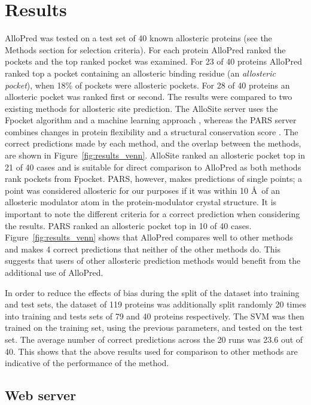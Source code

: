 \section{Results}

AlloPred was tested on a test set of 40 known allosteric proteins (see the Methods section for selection criteria).
For each protein AlloPred ranked the pockets and the top ranked pocket was examined.
For 23 of 40 proteins AlloPred ranked top a pocket containing an allosteric binding residue (an \emph{allosteric pocket}), when 18\% of pockets were allosteric pockets.
For 28 of 40 proteins an allosteric pocket was ranked first or second.
The results were compared to two existing methods for allosteric site prediction.
The AlloSite server uses the Fpocket algorithm and a machine learning approach \cite{Huang2013}, whereas the PARS server combines changes in protein flexibility and a structural conservation score \cite{Panjkovich2014}.
The correct predictions made by each method, and the overlap between the methods, are shown in Figure~\ref{fig:results_venn}.
AlloSite ranked an allosteric pocket top in 21 of 40 cases and is suitable for direct comparison to AlloPred as both methods rank pockets from Fpocket.
PARS, however, makes predictions of single points; a point was considered allosteric for our purposes if it was within 10 \AA\ of an allosteric modulator atom in the protein-modulator crystal structure.
It is important to note the different criteria for a correct prediction when considering the results.
PARS ranked an allosteric pocket top in 10 of 40 cases.
Figure~\ref{fig:results_venn} shows that AlloPred compares well to other methods and makes 4 correct predictions that neither of the other methods do.
This suggests that users of other allosteric prediction methods would benefit from the additional use of AlloPred.

In order to reduce the effects of bias during the split of the dataset into training and test sets, the dataset of 119 proteins was additionally split randomly 20 times into training and tests sets of 79 and 40 proteins respectively.
The SVM was then trained on the training set, using the previous parameters, and tested on the test set.
The average number of correct predictions across the 20 runs was 23.6 out of 40.
This shows that the above results used for comparison to other methods are indicative of the performance of the method.


\subsection{Web server}

